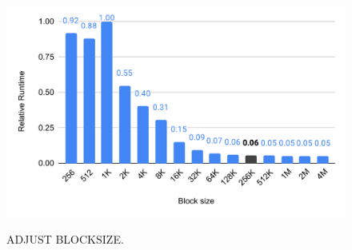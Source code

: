 \begin{figure}[hbtp]
  \centering
  \includegraphics[width=0.98\linewidth]{out/adjust-blocksize.pdf} \\[-2ex]
  \caption{ADJUST BLOCKSIZE.}
  \label{fig:adjust-blocksize}
\end{figure}
